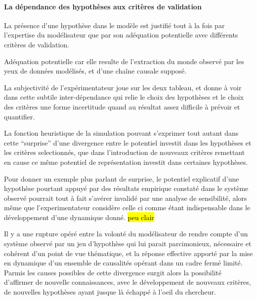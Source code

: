 \paragraph{La dépendance des hypothèses aux critères de validation}


La présence d'une hypothèse dans le modèle est justifié tout à la fois par l'expertise du modélisateur que par son adéquation potentielle avec différents critères de validation.

Adéquation potentielle car elle resulte de l'extraction du monde observé par les yeux de données modélisés, et d'une chaîne causale supposé. 

La subjectivité de l'expérimentateur joue sur les deux tableau, et donne à voir dans cette subtile inter-dépendance qui relie le choix des hypothèses et le choix des critères une forme incertitude quand au résultat assez difficile à prévoir et quantifier.

La fonction heuristique de la simulation pouvant s'exprimer tout autant dans cette \enquote{surprise} d'une divergence entre le potentiel investit dans les hypothèses et les critères selectionnés, que dans l'introduction de nouveaux critères remettant en cause ce même potentiel de représentation investit dans certaines hypothèses.

Pour donner un exemple plus parlant de surprise, le potentiel explicatif d'une hypothèse pourtant appuyé par des résultats empirique constaté dans le système observé pourrait tout à fait s'avérer invalidé par une analyse de sensibilité, alors même que l'experimentateur considère celle ci comme étant indispensable dans le développement d'une dynamique donné. \hl{peu clair}

Il y a une rupture opéré entre la volonté du modélisateur de rendre compte d'un système observé par un jeu d'hypothèse qui lui parait parcimonieux, nécessaire et cohérent d'un point de vue thématique, et la réponse effective apporté par la mise en dynamique d'un ensemble de causalités opérant dans un cadre fermé limité. Parmis les causes possibles de cette divergence surgit alors la possibilité d'affirmer de nouvelle connaissances, avec le développement de nouveaux critères, de nouvelles hypothèses ayant jusque là échappé à l'oeil du chercheur.

